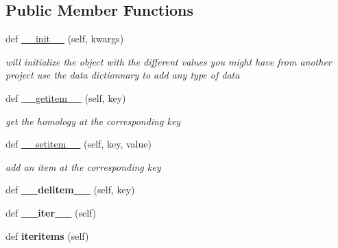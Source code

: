 \subsection*{Public Member Functions}
\begin{DoxyCompactItemize}
\item 
def \mbox{\hyperlink{class_py_c_u_b_1_1homoset_1_1_homo_set_adbe4d9e4087fe5b53d861476c011329d}{\+\_\+\+\_\+init\+\_\+\+\_\+}} (self, kwargs)
\begin{DoxyCompactList}\small\item\em will initialize the object with the different values you might have from another project use the data dictionnary to add any type of data \end{DoxyCompactList}\item 
def \mbox{\hyperlink{class_py_c_u_b_1_1homoset_1_1_homo_set_ab7ac33ea3033b440816e179cb4a5e3c0}{\+\_\+\+\_\+getitem\+\_\+\+\_\+}} (self, key)
\begin{DoxyCompactList}\small\item\em get the homology at the corresponding key \end{DoxyCompactList}\item 
def \mbox{\hyperlink{class_py_c_u_b_1_1homoset_1_1_homo_set_a42a7e7dc7ddb4b5717084cb093f90774}{\+\_\+\+\_\+setitem\+\_\+\+\_\+}} (self, key, value)
\begin{DoxyCompactList}\small\item\em add an item at the corresponding key \end{DoxyCompactList}\item 
\mbox{\label{class_py_c_u_b_1_1homoset_1_1_homo_set_a5211ffec9061ca49c771d070048524a1}} 
def {\bfseries \+\_\+\+\_\+delitem\+\_\+\+\_\+} (self, key)
\item 
\mbox{\label{class_py_c_u_b_1_1homoset_1_1_homo_set_a2d35b1436a2bbdaea69454ffbf648bf0}} 
def {\bfseries \+\_\+\+\_\+iter\+\_\+\+\_\+} (self)
\item 
\mbox{\label{class_py_c_u_b_1_1homoset_1_1_homo_set_aefca94ad0e64bcad582edcc163bc21ad}} 
def {\bfseries iteritems} (self)
\item 
\mbox{\label{class_py_c_u_b_1_1homoset_1_1_homo_set_ada72dc2741d84a8c617dc23449154fc2}} 

\end{DoxyCompactItemize}
